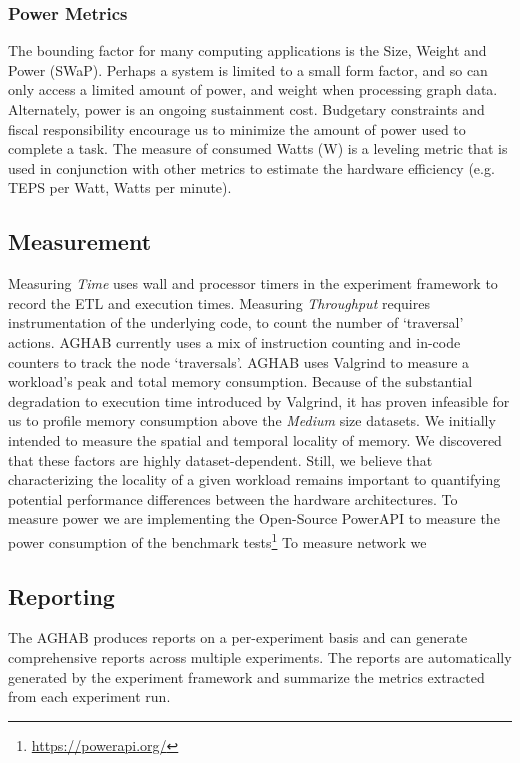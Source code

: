     \subsubsection{Power Metrics}
    The bounding factor for many computing applications is the Size, Weight and Power (SWaP). 
    Perhaps a system is limited to a small form factor, and so can only access a limited amount of power, and weight when processing graph data. 
    Alternately, power is an ongoing sustainment cost. 
    Budgetary constraints and fiscal responsibility encourage us to minimize the amount of power used to complete a task. 
    The measure of consumed Watts (W) is a leveling metric that is used in conjunction with other metrics to estimate the hardware efficiency (e.g. TEPS per Watt, Watts per minute).

    \subsection{Measurement}

    Measuring \textit{Time} uses wall and processor timers in the experiment framework to record the ETL and execution times. 
    Measuring \textit{Throughput} requires instrumentation of the underlying code, to count the number of `traversal' actions.
    AGHAB currently uses a mix of instruction counting and in-code counters to track the node `traversals'. 
    AGHAB uses Valgrind to measure a workload's peak and total memory consumption. Because of the substantial degradation to execution time introduced by Valgrind, it has proven infeasible for us to profile memory consumption above the \textit{Medium} size datasets. 
    We initially intended to measure the spatial and temporal locality of memory. We discovered that these factors are highly dataset-dependent. Still, we believe that characterizing the locality of a given workload remains important to quantifying potential performance differences between the hardware architectures. 
    To measure power we are implementing the Open-Source PowerAPI to measure the power consumption of the benchmark tests\footnote{\url{https://powerapi.org/}}
    To measure network we 

    \subsection{Reporting}
    The AGHAB produces reports on a per-experiment basis and can generate comprehensive reports across multiple experiments. 
    The reports are automatically generated by the experiment framework and summarize the metrics extracted from each experiment run. 
